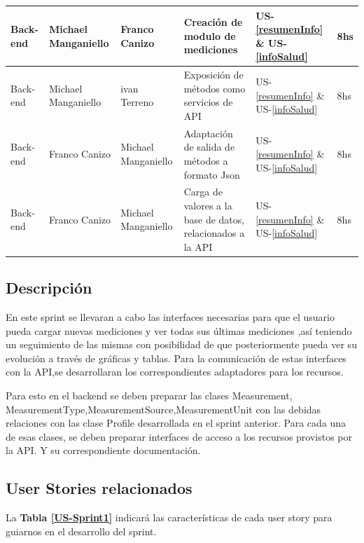 \documentclass[a4paper,12pt]{article}
\begin{document}
{\begin{center}
{\begin{tabular}{|l|l|l|p{5cm}|l|p{1cm}|}
					Back-end& Michael Manganiello & Franco Canizo & Creación de modulo de mediciones&US-\ref{resumenInfo} \& US-\ref{infoSalud} &8hs\\ \hline
					Back-end& Michael Manganiello & ivan Terreno & Exposición de métodos como servicios de API 	& US-\ref{resumenInfo} \& US-\ref{infoSalud}&8hs\\ \hline
					Back-end& Franco Canizo & Michael Manganiello   & Adaptación de salida de métodos a formato Json&US-\ref{resumenInfo} \& US-\ref{infoSalud} &8hs\\ \hline
					Back-end & Franco Canizo & Michael Manganiello  & Carga de valores a la base de datos, relacionados a la API&US-\ref{resumenInfo} \& US-\ref{infoSalud} &8hs \\ \hline
				\end{tabular}
			}
		\end{center}
	}

    
\subsection{Descripción}
En este sprint se llevaran a cabo las interfaces necesarias para que el usuario pueda cargar nuevas mediciones y ver todas sus últimas mediciones ,así teniendo un seguimiento de las mismas con posibilidad de que posteriormente pueda ver su evolución a través de gráficas y tablas.
Para la comunicación de estas interfaces con la API,se desarrollaran los correspondientes adaptadores para los recursos.

Para esto en el backend se deben preparar las clases Measurement, MeasurementType,MeasurementSource,MeasurementUnit con las debidas relaciones con las clase Profile desarrollada en el sprint anterior.
Para cada una de esas clases, se deben preparar interfaces de acceso a los recursos provistos por la API. Y su correspondiente documentación.


\subsection{User Stories relacionados}
La \textbf{Tabla \ref{US-Sprint1}} indicará las características de cada user story para guiarnos en el desarrollo del sprint.
\end{document}
